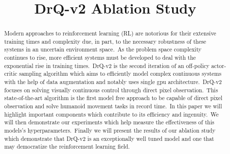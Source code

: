 \documentclass[conference]{./IEEEtran/IEEEtran} %
\begin{document}
    \title{DrQ-v2 Ablation Study}

    \author{
        \and
        \and
    }

    \maketitle

    \begin{abstract}
        
    Modern approaches to reinforcement learning (RL) are notorious for their extensive training times and complexity due, in
    part, to the necessary robustness of these systems in an uncertain environment space.\ As the problem space complexity
    continues to rise, more efficient systems must be developed to deal with the exponential rise in training times.\ DrQ-v2\cite{DrQv2}
    is the second iteration of an off-policy actor-critic sampling algorithm which aims to efficiently model complex continuous
    systems with the help of data augmentation and notably uses single gpu architecture.\ DrQ-v2 focuses on solving visually
    continuous control through direct pixel observation.\ This state-of-the-art algorithm is the first model free approach to be
    capable of direct pixel observation and solve humanoid movement tasks in record time.\ In this paper we will highlight
    important components which contribute to its efficiency and ingenuity.\ We will then demonstrate our experiments which help
    measure the effectiveness of this models's hyperparameters.\ Finally we will present the results of our ablation study which
    demonstrate that DrQ-v2 is an exceptionally well tuned model and one that may democratize the reinforcement learning field.\

    \end{abstract}
\end{document}

